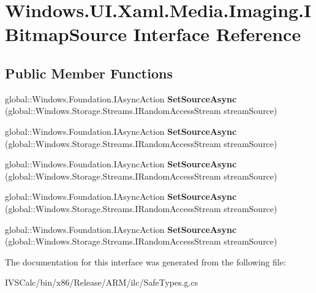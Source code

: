 \hypertarget{interface_windows_1_1_u_i_1_1_xaml_1_1_media_1_1_imaging_1_1_i_bitmap_source}{}\section{Windows.\+U\+I.\+Xaml.\+Media.\+Imaging.\+I\+Bitmap\+Source Interface Reference}
\label{interface_windows_1_1_u_i_1_1_xaml_1_1_media_1_1_imaging_1_1_i_bitmap_source}
\subsection*{Public Member Functions}
\begin{DoxyCompactItemize}
\item 
\mbox{\label{interface_windows_1_1_u_i_1_1_xaml_1_1_media_1_1_imaging_1_1_i_bitmap_source_a89888dc1641aa3d5c5a2cfa0117838b4}} 
global\+::\+Windows.\+Foundation.\+I\+Async\+Action {\bfseries Set\+Source\+Async} (global\+::\+Windows.\+Storage.\+Streams.\+I\+Random\+Access\+Stream stream\+Source)
\item 
\mbox{\label{interface_windows_1_1_u_i_1_1_xaml_1_1_media_1_1_imaging_1_1_i_bitmap_source_a89888dc1641aa3d5c5a2cfa0117838b4}} 
global\+::\+Windows.\+Foundation.\+I\+Async\+Action {\bfseries Set\+Source\+Async} (global\+::\+Windows.\+Storage.\+Streams.\+I\+Random\+Access\+Stream stream\+Source)
\item 
\mbox{\label{interface_windows_1_1_u_i_1_1_xaml_1_1_media_1_1_imaging_1_1_i_bitmap_source_a89888dc1641aa3d5c5a2cfa0117838b4}} 
global\+::\+Windows.\+Foundation.\+I\+Async\+Action {\bfseries Set\+Source\+Async} (global\+::\+Windows.\+Storage.\+Streams.\+I\+Random\+Access\+Stream stream\+Source)
\item 
\mbox{\label{interface_windows_1_1_u_i_1_1_xaml_1_1_media_1_1_imaging_1_1_i_bitmap_source_a89888dc1641aa3d5c5a2cfa0117838b4}} 
global\+::\+Windows.\+Foundation.\+I\+Async\+Action {\bfseries Set\+Source\+Async} (global\+::\+Windows.\+Storage.\+Streams.\+I\+Random\+Access\+Stream stream\+Source)
\item 
\mbox{\label{interface_windows_1_1_u_i_1_1_xaml_1_1_media_1_1_imaging_1_1_i_bitmap_source_a89888dc1641aa3d5c5a2cfa0117838b4}} 
global\+::\+Windows.\+Foundation.\+I\+Async\+Action {\bfseries Set\+Source\+Async} (global\+::\+Windows.\+Storage.\+Streams.\+I\+Random\+Access\+Stream stream\+Source)
\end{DoxyCompactItemize}


The documentation for this interface was generated from the following file\+:\begin{DoxyCompactItemize}
\item 
I\+V\+S\+Calc/bin/x86/\+Release/\+A\+R\+M/ilc/Safe\+Types.\+g.\+cs\end{DoxyCompactItemize}
